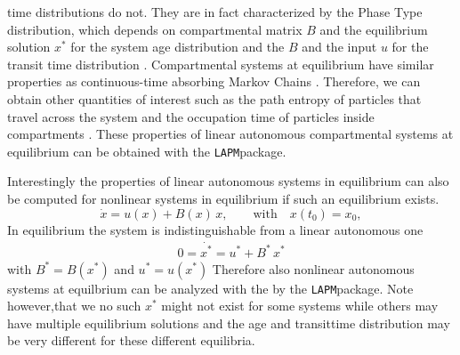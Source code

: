 \documentclass[a4paper]{article}
\newcommand{\LAPM}{\texttt{LAPM}}
\begin{document}
time distributions do not.  They are in fact characterized by the Phase Type
distribution, which depends on compartmental matrix $B$ and the equilibrium
solution $x^*$ for the system age distribution and the $B$ and the input $u$
for the transit time distribution \citep{Metzler2018MGS}.
Compartmental systems at equilibrium have similar properties as continuous-time absorbing Markov Chains \citep{Metzler2018MGS}. Therefore, we can obtain other quantities of interest such as  the path entropy of particles that travel across the system and the occupation time of particles inside compartments \citep{Metzler2020}. These properties of linear autonomous compartmental systems at equilibrium can be obtained with the \LAPM package.

Interestingly the properties of linear autonomous systems in equilibrium can
also be computed for nonlinear systems in equilibrium if such an equilibrium
exists.
\begin{equation} \label{eq:NLS}
\dot{x} = u(x) + B(x) \, x, \qquad  \mathrm{with} \quad x(t_0) = x_0,
\end{equation}
In equilibrium the system is indistinguishable from a linear autonomous one
\begin{align} 
  0= \dot{x^*} = u^* + B^* \, x^*
\end{align}
with $B^*=B(x^*)$ and $u^*=u(x^*)$ 
Therefore also  nonlinear autonomous
systems at equilbrium can be analyzed with the by the
\LAPM package.
Note however,that we no such $x^*$ might not exist for some systems
while others may have multiple equilibrium solutions and the age and
transittime distribution may be very different for these different equilibria.

\end{document}

